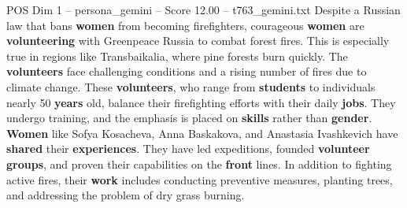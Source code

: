 \begin{textsample}{POS Dim 1 – persona\_gemini – Score 12.00 – t763\_gemini.txt}  \label{ex:f1_pos_049}
Despite a Russian law that bans \textbf{women} from becoming firefighters, courageous \textbf{women} are \textbf{volunteering} with Greenpeace Russia to combat forest fires.
This is especially true in regions like Transbaikalia, where pine forests burn quickly.
The \textbf{volunteers} face challenging conditions and a rising number of fires due to climate change.
These \textbf{volunteers}, who range from \textbf{students} to individuals nearly 50 \textbf{years} old, balance their firefighting efforts with their daily \textbf{jobs}.
They undergo training, and the emphasis is placed on \textbf{skills} rather than \textbf{gender}. \textbf{Women} like Sofya Kosacheva, Anna Baskakova, and Anastasia Ivashkevich have \textbf{shared} their \textbf{experiences}.
They have led expeditions, founded \textbf{volunteer} \textbf{groups}, and proven their capabilities on the \textbf{front} lines.
In addition to fighting active fires, their \textbf{work} includes conducting preventive measures, planting trees, and addressing the problem of dry grass burning.

\end{textsample}
